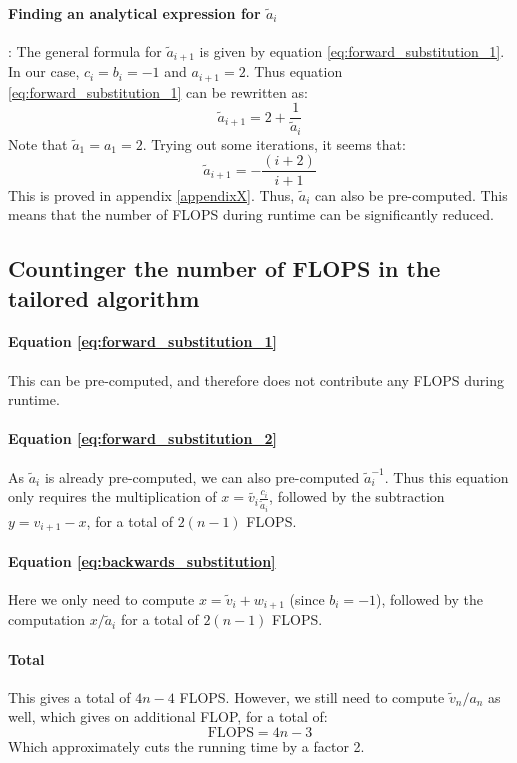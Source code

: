 \documentclass[a4paper, 10pt]{article}
\begin{document}
\paragraph*{Finding an analytical expression for $\tilde{a}_i$}: The general formula for $\tilde{a}_{i+1}$ is given by equation \ref{eq:forward_substitution_1}. In our case, $c_i=b_i=-1$ and $a_{i+1}=2$. Thus equation \ref{eq:forward_substitution_1} can be rewritten as:
\begin{equation}\label{eq:forward_substitution_tailored}
\tilde{a}_{i+1}=2+\frac{1}{\tilde{a}_i}
\end{equation}
Note that $\tilde{a}_1=a_1=2$. Trying out some iterations, it seems that:
\begin{equation}
\tilde{a}_{i+1}=-\frac{(i+2)}{i+1}
\end{equation}
This is proved in appendix \ref{appendixX}. Thus, $\tilde{a}_i$ can also be pre-computed. This means that the number of FLOPS during runtime can be significantly reduced.
\subsection*{Countinger the number of FLOPS in the tailored algorithm}
\paragraph{Equation \ref{eq:forward_substitution_1}} This can be pre-computed, and therefore does not contribute any FLOPS during runtime. 
\paragraph*{Equation \ref{eq:forward_substitution_2}} As $\tilde{a}_i$ is already pre-computed, we can also pre-computed $\tilde{a}_i^{-1}$. Thus this equation only requires the multiplication of $x=\tilde{v_i}\frac{c_i}{\tilde{a}_i}$, followed by the subtraction $y=v_{i+1}-x$, for a total of $2(n-1)$ FLOPS. 
\paragraph*{Equation \ref{eq:backwards_substitution}} Here we only need to compute $x=\tilde{v}_i+w_{i+1}$ (since $b_i=-1$), followed by the computation $x/\tilde{a}_i$ for a total of $2(n-1)$ FLOPS. 
\paragraph*{Total}
This gives a total of $4n-4$ FLOPS. However, we still need to compute $\tilde{v}_n/a_n$ as well, which gives on additional FLOP, for a total of:
$$\mathrm{FLOPS}=4n-3$$
Which approximately cuts the running time by a factor 2. 
\end{document}

